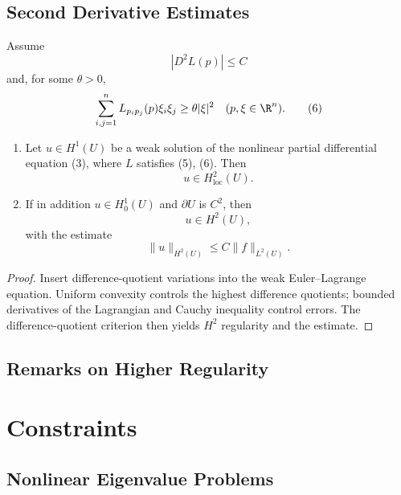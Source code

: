 \subsection{Second Derivative Estimates}
\label{sec:second-derivative-estimates-calculus-of-variations}

Assume
\[
|D^2L(p)|\leq C
\tag{5}
\]
and, for some $\theta>0$,
\[
\sum_{i,j=1}^nL_{p_ip_j}(p)\xi_i\xi_j\geq\theta|\xi|^2
\quad(p,\xi\in\R^n).
\tag{6}
\]

\begin{theorem}
\label{thm:second-derivatives-minimizers}
\begin{enumerate}
\item[(i)] Let $u \in H^1(U)$ be a weak solution of the nonlinear partial differential equation (3), where $L$ satisfies (5), (6). Then
\[
u \in H^2_{\mathrm{loc}}(U).
\]
\item[(ii)] If in addition $u \in H_0^1(U)$ and $\partial U$ is $C^2$, then
\[
u \in H^2(U),
\]
with the estimate
\[
\|u\|_{H^2(U)} \le C\|f\|_{L^2(U)}.
\]
\end{enumerate}
\end{theorem}

\begin{proof}
\sketch Insert difference-quotient variations into the weak Euler--Lagrange equation. Uniform convexity controls the highest difference quotients; bounded derivatives of the Lagrangian and Cauchy inequality control errors. The difference-quotient criterion then yields $H^2$ regularity and the estimate.
\end{proof}

\subsection{Remarks on Higher Regularity}
\label{sec:higher-regularity-remarks}

\section{Constraints}
\label{sec:constraints-calculus-of-variations}

\subsection{Nonlinear Eigenvalue Problems}
\label{sec:nonlinear-eigenvalue-problems}

